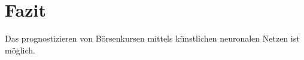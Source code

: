 \chapter{Fazit} %
\label{cha:Fazit}
Das prognostizieren von Börsenkursen mittels künstlichen neuronalen Netzen ist möglich.